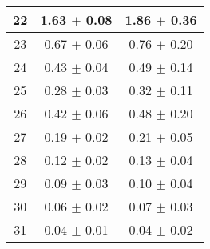 \begin{table}[!htbp]
\begin{tabular}{c|c|c}
22 & 1.63  $\pm$  0.08  & 1.86 $\pm$ 0.36    \\\hline
23 & 0.67  $\pm$  0.06  & 0.76 $\pm$ 0.20    \\\hline
24 & 0.43  $\pm$  0.04  & 0.49 $\pm$ 0.14    \\\hline
25 & 0.28  $\pm$  0.03  & 0.32 $\pm$ 0.11    \\\hline
26 & 0.42  $\pm$  0.06  & 0.48 $\pm$ 0.20    \\\hline
27 & 0.19  $\pm$  0.02  & 0.21 $\pm$ 0.05    \\\hline
28 & 0.12  $\pm$  0.02  & 0.13 $\pm$ 0.04    \\\hline
29 & 0.09  $\pm$  0.03  & 0.10 $\pm$ 0.04    \\\hline
30 & 0.06  $\pm$  0.02  & 0.07 $\pm$ 0.03    \\\hline
31 & 0.04  $\pm$  0.01  & 0.04 $\pm$ 0.02    \\\hline
\end{tabular}
\end{table}

